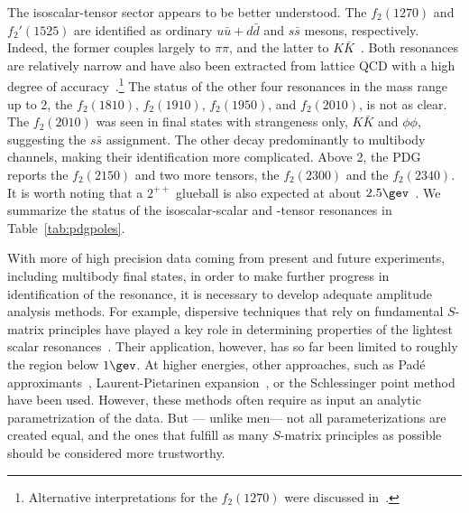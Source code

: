 The isoscalar-tensor sector appears to be better understood.
The $f_2(1270)$ and $f_2'(1525)$  are 
identified as ordinary $u\bar u + d\bar d$ and $s\bar s$ mesons, respectively.
 Indeed, the former couples largely to $\pi \pi$, and  the latter to $K\bar  K$~\cite{GarciaMartin:2011cn,Pelaez:2018qny,Pelaez:2020gnd}. Both resonances are relatively narrow and 
  have also been extracted from lattice QCD with a high degree of accuracy~\cite{Briceno:2017qmb}.\footnote{Alternative interpretations for the $f_2(1270)$ were discussed in~\cite{Molina:2008jw,Gulmez:2016scm,Geng:2016pmf,Du:2018gyn,Molina:2019rai}.}
 The status of  the other four resonances in the mass range up to 2\gev, the $f_2(1810)$, $f_2(1910)$, $f_2(1950)$, and $f_2(2010)$, is not as clear. The $f_2(2010)$ was seen in final states with strangeness only, $K\bar K$ and $\phi\phi$, suggesting the $s\bar s$ assignment. 
The other decay predominantly to multibody channels, making their identification more complicated. Above 2\gev, the PDG reports the $f_2(2150)$ and two more tensors, the  $f_2(2300)$ and the $f_2(2340)$. It is worth noting that a $2^{++}$ glueball is also expected at about $2.5\gev$~\cite{Morningstar:1999rf}. We summarize the status 
 of the isoscalar-scalar and -tensor resonances in Table~\ref{tab:pdgpoles}.

With more of high precision data coming from present and future experiments, including multibody final states,  in order to make further progress in identification of the resonance,   it is necessary to develop adequate amplitude analysis methods. For example,  dispersive techniques that rely on fundamental $S$-matrix principles  have played a key role in determining properties of the lightest scalar resonances~\cite{Caprini:2005zr,DescotesGenon:2006uk,GarciaMartin:2011nna,Hoferichter:2011wk,Moussallam:2011zg,Ditsche:2012fv,Pelaez:2020uiw,Pelaez:2020gnd}.  Their  application, however, has so far been limited to roughly the region below $1\gev$. At higher energies, other  approaches, such as Pad\'e approximants~\cite{Masjuan:2013jha,Masjuan:2014psa,Caprini:2016uxy,Pelaez:2016klv}, Laurent-Pietarinen expansion~\cite{Svarc:2014sqa}, or the Schlessinger point method~\cite{Tripolt:2016cya,Tripolt:2018xeo,Binosi:2019ecz} have been used. However, these methods often require as input an analytic parametrization of the data. But --- unlike men--- not all parameterizations are created equal, and the ones that fulfill as many $S$-matrix principles as possible should be considered more trustworthy. 


